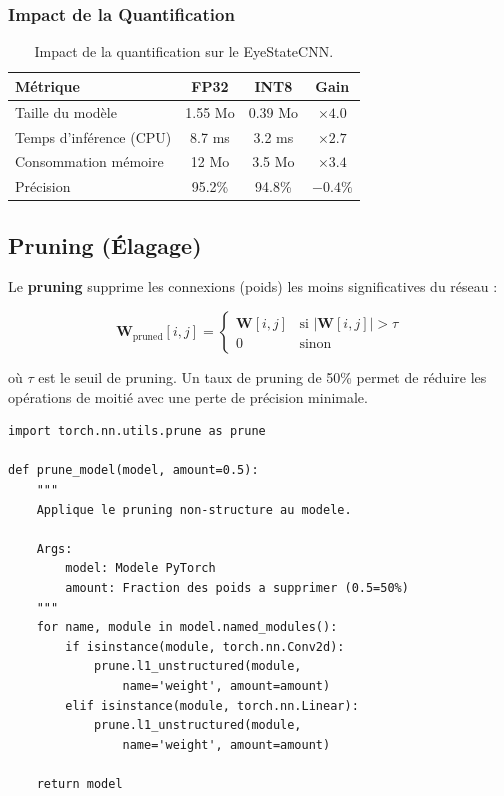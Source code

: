 \documentclass[12pt,a4paper,twoside]{report}
\newcommand{\keyword}[1]{\textbf{\textcolor{stellantisblue}{#1}}}
\begin{document}
\subsubsection{Impact de la Quantification}

\begin{table}[H]
\centering
\caption{Impact de la quantification sur le EyeStateCNN.}
\label{tab:quantization_impact}
\renewcommand{\arraystretch}{1.3}
\begin{tabular}{|l|c|c|c|}
\hline
\rowcolor{stellantisblue!15}
\textbf{Métrique} & \textbf{FP32} & \textbf{INT8} & \textbf{Gain} \\
\hline
Taille du modèle & 1.55 Mo & 0.39 Mo & $\times 4.0$ \\
\hline
Temps d'inférence (CPU) & 8.7 ms & 3.2 ms & $\times 2.7$ \\
\hline
Consommation mémoire & 12 Mo & 3.5 Mo & $\times 3.4$ \\
\hline
Précision & 95.2\% & 94.8\% & $-0.4\%$ \\
\hline
\end{tabular}
\end{table}

\subsection{Pruning (Élagage)}

Le \keyword{pruning} supprime les connexions (poids) les moins significatives du réseau :

\begin{equation}
\mathbf{W}_{\text{pruned}}[i, j] = \begin{cases}
    \mathbf{W}[i, j] & \text{si } |\mathbf{W}[i, j]| > \tau \\
    0 & \text{sinon}
\end{cases}
\label{eq:pruning}
\end{equation}

où $\tau$ est le seuil de pruning. Un taux de pruning de 50\% permet de réduire les opérations de moitié avec une perte de précision minimale.

\begin{lstlisting}[style=pythonstyle, caption={Pruning structuré du CNN.}, label={lst:pruning}]
import torch.nn.utils.prune as prune

def prune_model(model, amount=0.5):
    """
    Applique le pruning non-structure au modele.
    
    Args:
        model: Modele PyTorch
        amount: Fraction des poids a supprimer (0.5=50%)
    """
    for name, module in model.named_modules():
        if isinstance(module, torch.nn.Conv2d):
            prune.l1_unstructured(module, 
                name='weight', amount=amount)
        elif isinstance(module, torch.nn.Linear):
            prune.l1_unstructured(module, 
                name='weight', amount=amount)
    
    return model
\end{lstlisting}
\end{document}
